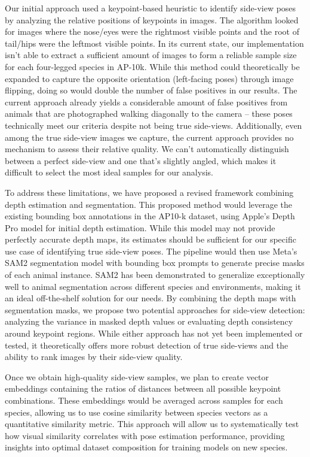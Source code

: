 \documentclass[conference]{IEEEtran}
\begin{document}
Our initial approach used a keypoint-based heuristic to identify side-view poses by analyzing the relative positions of keypoints in images. 
The algorithm looked for images where the nose/eyes were the rightmost visible points and the root of tail/hips were the leftmost visible points.
In its current state, our implementation isn’t able to extract a sufficient amount of images to form a reliable sample size for each four-legged species in AP-10k.
While this method could theoretically be expanded to capture the opposite orientation (left-facing poses) through image flipping, doing so would double the number of false positives in our results.
The current approach already yields a considerable amount of false positives from animals that are photographed walking diagonally to the camera – these poses technically meet our criteria despite not being true side-views.
Additionally, even among the true side-view images we capture, the current approach provides no mechanism to assess their relative quality.
We can’t automatically distinguish between a perfect side-view and one that's slightly angled, which makes it difficult to select the most ideal samples for our analysis.

To address these limitations, we have proposed a revised framework combining depth estimation and segmentation.
This proposed method would leverage the existing bounding box annotations in the AP10-k dataset, using Apple’s Depth Pro model for initial depth estimation.
While this model may not provide perfectly accurate depth maps, its estimates should be sufficient for our specific use case of identifying true side-view poses.
The pipeline would then use Meta’s SAM2 segmentation model with bounding box prompts to generate precise masks of each animal instance.
SAM2 has been demonstrated to generalize exceptionally well to animal segmentation across different species and environments, making it an ideal off-the-shelf solution for our needs.
By combining the depth maps with segmentation masks, we propose two potential approaches for side-view detection: analyzing the variance in masked depth values or evaluating depth consistency around keypoint regions.
While either approach has not yet been implemented or tested, it theoretically offers more robust detection of true side-views and the ability to rank images by their side-view quality.

Once we obtain high-quality side-view samples, we plan to create vector embeddings containing the ratios of distances between all possible keypoint combinations.
These embeddings would be averaged across samples for each species, allowing us to use cosine similarity between species vectors as a quantitative similarity metric.
This approach will allow us to systematically test how visual similarity correlates with pose estimation performance, providing insights into optimal dataset composition for training models on new species.
\end{document}
